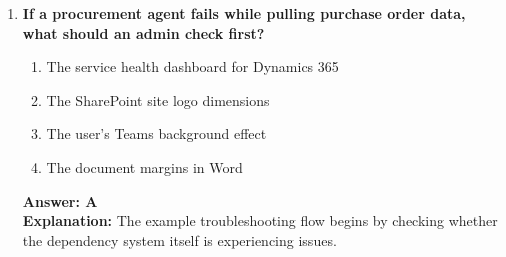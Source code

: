 \documentclass[10pt]{article}
\begin{document}
\begin{enumerate}[leftmargin=*]
\item \textbf{If a procurement agent fails while pulling purchase order data, what should an admin check first?}
\begin{enumerate}[label=\Alph*.]
  \item The service health dashboard for Dynamics 365
  \item The SharePoint site logo dimensions
  \item The user's Teams background effect
  \item The document margins in Word
\end{enumerate}
\textbf{Answer: A}\\
\textbf{Explanation:} The example troubleshooting flow begins by checking whether the dependency system itself is experiencing issues.

\end{enumerate}
\end{document}
